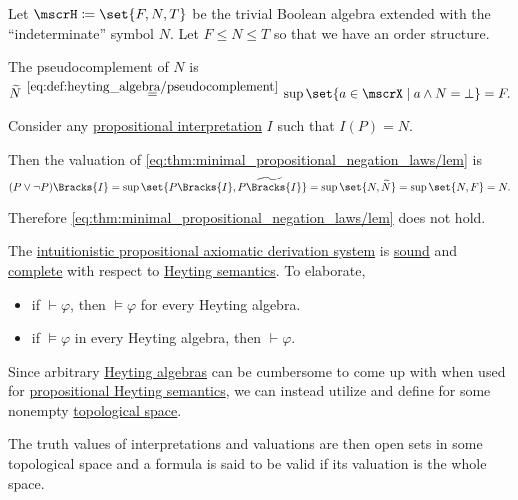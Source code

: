 \begin{example}\label{ex:heyting_semantics_lem_counterexample}
  Let \( \mscrH \coloneqq \set{ F, N, T } \) be the trivial Boolean algebra extended with the \enquote{indeterminate} symbol \( N \). Let \( F \leq N \leq T \) so that we have an order structure.

  The pseudocomplement of \( N \) is
  \begin{equation*}
    \widetilde{N}
    \reloset {\eqref{eq:def:heyting_algebra/pseudocomplement}} =
    \sup\set{ a \in \mscrX \given a \wedge N = \bot }
    =
    F.
  \end{equation*}

  Consider any \hyperref[def:propositional_semantics/interpretation]{propositional interpretation} \( I \) such that \( I(P) = N \).

  Then the valuation of \eqref{eq:thm:minimal_propositional_negation_laws/lem} is
  \begin{equation*}
    (P \vee \neg P)\Bracks{I}
    =
    \sup\set{ P\Bracks{I}, \widetilde{P\Bracks{I}} }
    =
    \sup\set{ N, \widetilde{N} }
    =
    \sup\set{ N, F }
    =
    N.
  \end{equation*}

  Therefore \eqref{eq:thm:minimal_propositional_negation_laws/lem} does not hold.
\end{example}

\begin{theorem}\label{thm:intuitionistic_propositional_logic_is_sound_and_complete}
  The \hyperref[def:intuitionistic_propositional_axiomatic_derivation_system]{intuitionistic propositional axiomatic derivation system} is \hyperref[def:derivability_and_satisfiability/soundness]{sound} and \hyperref[def:derivability_and_satisfiability/completeness]{complete} with respect to \hyperref[def:propositional_heyting_semantics]{Heyting semantics}. To elaborate,
  \begin{itemize}
    \item if \( \vdash \varphi \), then \( \vDash \varphi \) for every Heyting algebra.
    \item if \( \vDash \varphi \) in every Heyting algebra, then \( \vdash \varphi \).
  \end{itemize}
\end{theorem}

\begin{definition}\label{def:propositional_topological_semantics}
  Since arbitrary \hyperref[def:heyting_algebra]{Heyting algebras} can be cumbersome to come up with when used for \hyperref[def:propositional_heyting_semantics]{propositional Heyting semantics}, we can instead utilize  and define  for some nonempty \hyperref[def:topological_space]{topological space}.

  The truth values of interpretations and valuations are then open sets in some topological space and a formula is said to be valid if its valuation is the whole space.
\end{definition}

